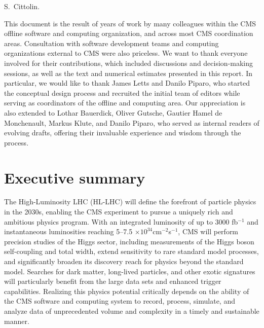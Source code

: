 
S.~Cittolin.


This document is the result of years of work by many colleagues within the CMS offline software and computing organization, and across most CMS coordination areas. Consultation with software development teams and computing organizations external to CMS were also priceless. We want to thank everyone involved for their contributions, which included discussions and decision-making sessions, as well as the text and numerical estimates presented in this report. In particular, we would like to thank James Letts and Danilo Piparo, who started the conceptual design process and recruited the initial team of editors while serving as coordinators of the offline and computing area. Our appreciation is also extended to Lothar Bauerdick, Oliver Gutsche, Gautier Hamel de Monchenault, Markus Klute, and Danilo Piparo, who served as internal readers of evolving drafts, offering their invaluable experience and wisdom through the process.

\clearpage
\tableofcontents

%
%
% 
\section*{Executive summary}
\label{sec:execsum}

The High-Luminosity LHC (HL-LHC) will define the forefront of particle physics in the 2030s, enabling the CMS experiment to pursue a uniquely rich and ambitious physics program. With an integrated luminosity of up to 3000 fb$^{-1}$ and instantaneous luminosities reaching 5–7.5 $\times10^{34} $cm$^{-2}$s$^{-1}$, CMS will perform precision studies of the Higgs sector, including measurements of the Higgs boson self-coupling and total width, extend sensitivity to rare standard model processes, and significantly broaden its discovery reach for physics beyond the standard model. Searches for dark matter, long-lived particles, and other exotic signatures will particularly benefit from the large data sets and enhanced trigger capabilities. Realizing this physics potential critically depends on the ability of the CMS software and computing system to record, process, simulate, and analyze data of unprecedented volume and complexity in a timely and sustainable manner.

